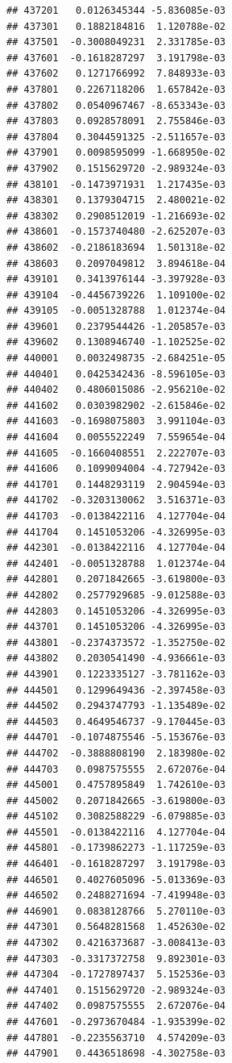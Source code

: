 \begin{frame}[fragile]
\begin{verbatim}
## 437201   0.0126345344 -5.836085e-03
## 437301   0.1882184816  1.120788e-02
## 437501  -0.3008049231  2.331785e-03
## 437601  -0.1618287297  3.191798e-03
## 437602   0.1271766992  7.848933e-03
## 437801   0.2267118206  1.657842e-03
## 437802   0.0540967467 -8.653343e-03
## 437803   0.0928578091  2.755846e-03
## 437804   0.3044591325 -2.511657e-03
## 437901   0.0098595099 -1.668950e-02
## 437902   0.1515629720 -2.989324e-03
## 438101  -0.1473971931  1.217435e-03
## 438301   0.1379304715  2.480021e-02
## 438302   0.2908512019 -1.216693e-02
## 438601  -0.1573740480 -2.625207e-03
## 438602  -0.2186183694  1.501318e-02
## 438603   0.2097049812  3.894618e-04
## 439101   0.3413976144 -3.397928e-03
## 439104  -0.4456739226  1.109100e-02
## 439105  -0.0051328788  1.012374e-04
## 439601   0.2379544426 -1.205857e-03
## 439602   0.1308946740 -1.102525e-02
## 440001   0.0032498735 -2.684251e-05
## 440401   0.0425342436 -8.596105e-03
## 440402   0.4806015086 -2.956210e-02
## 441602   0.0303982902 -2.615846e-02
## 441603  -0.1698075803  3.991104e-03
## 441604   0.0055522249  7.559654e-04
## 441605  -0.1660408551  2.222707e-03
## 441606   0.1099094004 -4.727942e-03
## 441701   0.1448293119  2.904594e-03
## 441702  -0.3203130062  3.516371e-03
## 441703  -0.0138422116  4.127704e-04
## 441704   0.1451053206 -4.326995e-03
## 442301  -0.0138422116  4.127704e-04
## 442401  -0.0051328788  1.012374e-04
## 442801   0.2071842665 -3.619800e-03
## 442802   0.2577929685 -9.012588e-03
## 442803   0.1451053206 -4.326995e-03
## 443701   0.1451053206 -4.326995e-03
## 443801  -0.2374373572 -1.352750e-02
## 443802   0.2030541490 -4.936661e-03
## 443901   0.1223335127 -3.781162e-03
## 444501   0.1299649436 -2.397458e-03
## 444502   0.2943747793 -1.135489e-02
## 444503   0.4649546737 -9.170445e-03
## 444701  -0.1074875546 -5.153676e-03
## 444702  -0.3888808190  2.183980e-02
## 444703   0.0987575555  2.672076e-04
## 445001   0.4757895849  1.742610e-03
## 445002   0.2071842665 -3.619800e-03
## 445102   0.3082588229 -6.079885e-03
## 445501  -0.0138422116  4.127704e-04
## 445801  -0.1739862273 -1.117259e-03
## 446401  -0.1618287297  3.191798e-03
## 446501   0.4027605096 -5.013369e-03
## 446502   0.2488271694 -7.419948e-03
## 446901   0.0838128766  5.270110e-03
## 447301   0.5648281568  1.452630e-02
## 447302   0.4216373687 -3.008413e-03
## 447303  -0.3317372758  9.892301e-03
## 447304  -0.1727897437  5.152536e-03
## 447401   0.1515629720 -2.989324e-03
## 447402   0.0987575555  2.672076e-04
## 447601  -0.2973670484 -1.935399e-02
## 447801  -0.2235563710  4.574209e-03
## 447901   0.4436518698 -4.302758e-03

\end{verbatim}
\end{frame}
